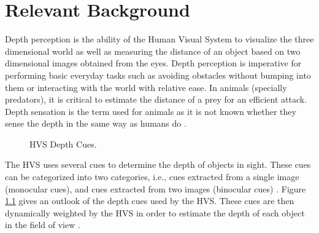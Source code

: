 \chapter{Relevant Background}
\label{chap:reletiveBackground}

Depth perception is the ability of the Human Visual System  to visualize the three dimensional world as well as measuring the distance of an object based on two dimensional images obtained from the eyes. Depth perception is imperative for performing basic everyday tasks such as avoiding obstacles without bumping into them or interacting with the world with relative ease. In animals (specially predators), it is critical to estimate the distance of a prey for an efficient attack. Depth sensation is the term used for animals as it is not known whether they sense the depth in the same way as humans do \cite{ wiki:depth_perception}.

\begin{figure}
\caption{HVS Depth Cues.\label{fig:CueTree}}
\end{figure}

The HVS uses several cues to determine the depth of objects in sight. These cues can be categorized into two categories, i.e., cues extracted from a single image (monocular cues), and cues extracted from two images (binocular cues) \cite{depthcues1} \cite{ wiki:depth_perception}. Figure \ref{fig:CueTree} gives an outlook of the depth cues used by the HVS. These cues are then dynamically weighted by the HVS in order to estimate the depth of each object in the field of view \cite{CueFusion}.


